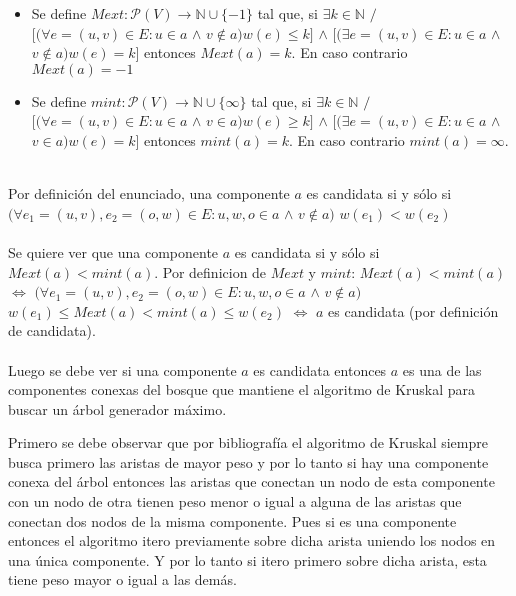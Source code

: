 \documentclass[a4paper]{article}
\begin{document}
\begin{itemize}
    \item Se define $Mext: \mathcal{P}(V) \longrightarrow \mathbb{N} \cup \{ -1 \}$ tal que, si $\exists k \in \mathbb{N} $ $/$ $   [(\forall e = (u,v) \in E : u \in a $ $\land$ $ v \notin a ) w(e) \leq k ] $  $\land$   $ [(\exists e = (u,v) \in E : u \in a $ $\land$ $ v \notin a ) w(e) = k] $  entonces $Mext(a)=k$. En caso contrario $Mext(a)=-1$
    \item Se define $mint: \mathcal{P}(V) \longrightarrow \mathbb{N} \cup \{ \infty \} $ tal que, si $\exists k \in \mathbb{N} $ $/$ $   [(\forall e = (u,v) \in E : u \in a $ $\land$ $ v \in a ) w(e) \geq k ] $  $\land$   $ [(\exists e = (u,v) \in E : u \in a $ $\land$ $ v \in a ) w(e) = k] $  entonces $mint(a)=k$. En caso contrario $mint(a)= \infty$.
\end{itemize}
\\
Por definición del enunciado, una componente $a$ es candidata si y sólo si $(\forall e_1 = (u,v), e_2 = (o, w) \in E : u, w, o \in a $  $\land$ $ v \notin a)$ $ w(e_1) < w(e_2) $ 
\\
\\
Se quiere ver que una componente $a$ es candidata si y sólo si $Mext(a) < mint(a)$. Por definicion de $Mext$ y $mint$: 
 $Mext(a) < mint(a)$ $\iff$ $ (\forall e_1 = (u,v), e_2 = (o, w) \in E : u, w, o \in a $  $\land$ $ v \notin a)$ 
$ w(e_1) \leq Mext(a) < mint(a) \leq w(e_2) $ $\iff$ $a$ es candidata (por definición de candidata).
\\
\\
Luego se debe ver si una componente $a$ es candidata  entonces $a$ es una de las componentes conexas del bosque que mantiene el algoritmo de Kruskal para buscar un árbol generador máximo.

Primero se debe observar que por bibliografía el algoritmo de Kruskal siempre busca primero las aristas de mayor peso y por lo tanto si hay una componente conexa del árbol entonces las aristas que conectan un nodo de esta componente con un nodo de otra tienen peso menor o igual a alguna de las aristas que conectan dos nodos de la misma componente. Pues si es una componente entonces el algoritmo itero previamente sobre dicha arista uniendo los nodos en una única componente. Y por lo tanto si itero primero sobre dicha arista, esta tiene peso mayor o igual a las demás.
\end{document}
